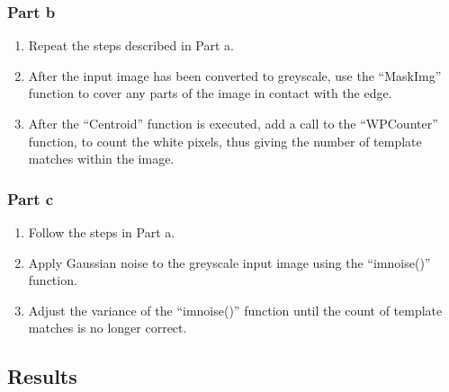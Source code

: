 \documentclass[a4paper]{article}
\begin{document}
	\subsubsection{Part b}
	\begin{enumerate}
		\item Repeat the steps described in Part a.
		\item After the input image has been converted to greyscale, use
			the ``MaskImg'' function to cover any parts of the image
			in contact with the edge.
		\item After the ``Centroid'' function is executed, add a call to
			the ``WPCounter'' function, to count the white pixels,
			thus giving the number of template matches within the
			image.
	\end{enumerate}
	\subsubsection{Part c}
	\begin{enumerate}
		\item Follow the steps in Part a.
		\item Apply Gaussian noise to the greyscale input image using
			the ``imnoise()'' function.
		\item Adjust the variance of the ``imnoise()'' function until
			the count of template matches is no longer correct.
	\end{enumerate}
	\subsection{Results}
\end{document}
